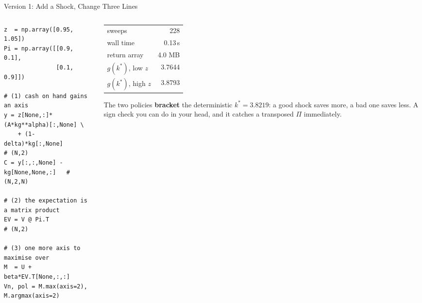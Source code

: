 \begin{frame}[fragile]{Version 1: Add a Shock, Change Three Lines}
\begin{columns}[T]
\begin{column}{0.54\textwidth}
\begin{lstlisting}
z  = np.array([0.95, 1.05])
Pi = np.array([[0.9, 0.1],
               [0.1, 0.9]])

# (1) cash on hand gains an axis
y = z[None,:]*(A*kg**alpha)[:,None] \
    + (1-delta)*kg[:,None]          # (N,2)
C = y[:,:,None] - kg[None,None,:]   # (N,2,N)

# (2) the expectation is a matrix product
EV = V @ Pi.T                       # (N,2)

# (3) one more axis to maximise over
M  = U + beta*EV.T[None,:,:]
Vn, pol = M.max(axis=2), M.argmax(axis=2)
\end{lstlisting}
\end{column}
\begin{column}{0.43\textwidth}
\small
\begin{center}\footnotesize
\begin{tabular}{@{}lr@{}}
\toprule
sweeps & 228 \\
wall time & 0.13\,s \\
return array & 4.0 MB \\
$g(k^{*})$, low $z$ & 3.7644 \\
$g(k^{*})$, high $z$ & 3.8793 \\
\bottomrule
\end{tabular}
\end{center}
\medskip
\begin{examplebox}\footnotesize
The two policies \textbf{bracket} the deterministic $k^{*}=3.8219$: a good shock saves more, a bad one saves less. A sign check you can do in your head, and it catches a transposed $\Pi$ immediately.
\end{examplebox}
\end{column}
\end{columns}
\vspace{1mm}
\end{frame}


